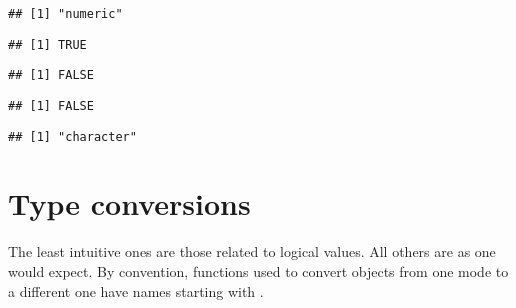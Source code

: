 \documentclass[paper=a4,10pt,div=17,headsepline,BCOR=12mm,twoside,open=right]{scrbook}\usepackage{knitr}
\begin{document}
\begin{knitrout}\footnotesize
{}\color{fgcolor}\begin{kframe}
\begin{alltt}
 \hlkwb{<-} \hlopt{:}
\end{alltt}
\begin{verbatim}
## [1] "numeric"
\end{verbatim}
\begin{alltt}
\end{alltt}
\begin{verbatim}
## [1] TRUE
\end{verbatim}
\begin{alltt}
\end{alltt}
\begin{verbatim}
## [1] FALSE
\end{verbatim}
\begin{alltt}
\end{alltt}
\begin{verbatim}
## [1] FALSE
\end{verbatim}
\begin{alltt}
 \hlkwb{<-} 
\end{alltt}
\begin{verbatim}
## [1] "character"
\end{verbatim}
\end{kframe}
\end{knitrout}

\section{Type conversions}

The least intuitive ones are those related to logical values. All others are as one would expect. By convention, functions used to convert objects from one mode to a different one have names starting with .
\end{document}
